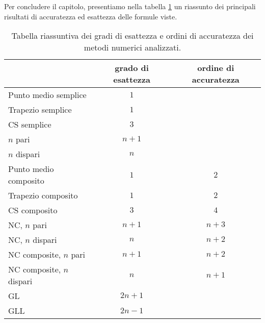 Per concludere il capitolo, presentiamo nella tabella \ref{tab:gradi-ordini} un riassunto dei principali risultati di accuratezza ed esattezza delle formule viste.

\begin{table}[ht]
\centering
{\renewcommand{\arraystretch}{1.3}%
\begin{tabular}{lcc}
\toprule
   & grado di esattezza & ordine di accuratezza \\
\midrule
 Punto medio semplice & $1$ &  \\
 Trapezio semplice & $1$ &  \\
 CS semplice & $3$ &  \\
 $n$ pari & $n+1$ &  \\
 $n$ dispari & $n$ &  \\
\hline
 Punto medio composito & $1$ & $2$ \\
 Trapezio composito & $1$ & $2$ \\
 CS composito & $3$ & $4$ \\
\hline
 NC, $n$ pari & $n+1$ & $n+3$ \\
 NC, $n$ dispari & $n$ & $n+2$ \\
 NC composite, $n$ pari & $n+1$ & $n+2$ \\
 NC composite, $n$ dispari & $n$ & $n+1$ \\
\hline
 GL & $2n+1$ &  \\
 GLL & $2n-1$ &  \\
 \bottomrule
\end{tabular}
}
\caption{Tabella riassuntiva dei gradi di esattezza e ordini di accuratezza dei metodi numerici analizzati.}
\label{tab:gradi-ordini}
\end{table}
